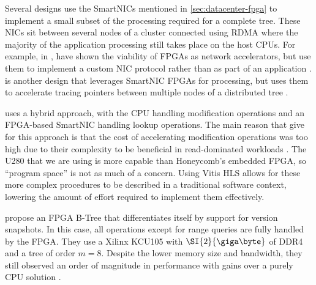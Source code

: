 

Several designs \autocite{honeycomb,strom,star} use the SmartNICs mentioned in
\autoref{sec:datacenter-fpga} to implement a small subset of the processing required
for a complete tree. These NICs sit between several nodes of a cluster connected
using RDMA where the majority of the application processing still takes place on
the host CPUs.
%
For example, in , \citeauthor{star} have shown the viability of
FPGAs as network accelerators, but use them to implement a custom NIC protocol
rather than as part of an application \autocite{star}.
%
 is another design that leverages SmartNIC FPGAs for
processing, but uses them to accelerate tracing pointers between multiple nodes
of a distributed tree \autocite{strom}.

 uses a hybrid approach, with the CPU handling modification
operations and an FPGA-based SmartNIC handling lookup operations. The main
reason that \citeauthor{honeycomb} give for this approach is that the cost of
accelerating modification operations was too high due to their complexity to be
beneficial in read-dominated workloads \autocite{honeycomb}. The U280 that we
are using is more capable than Honeycomb's embedded FPGA, so ``program space''
is not as much of a concern. Using Vitis HLS allows for these more complex
procedures to be described in a traditional software context, lowering the
amount of effort required to implement them effectively.

\citeauthor{ren-fpl-2019} propose an FPGA B-Tree that differentiates itself by
support for version snapshots. In this case, all operations except for range
queries are fully handled by the FPGA. They use a Xilinx KCU105 with
$\SI{2}{\giga\byte}$ of DDR4 and a tree of order $m=8$. Despite the lower memory
size and bandwidth, they still observed an order of magnitude in performance
with gains over a purely CPU solution \autocite{ren-fpl-2019}.
